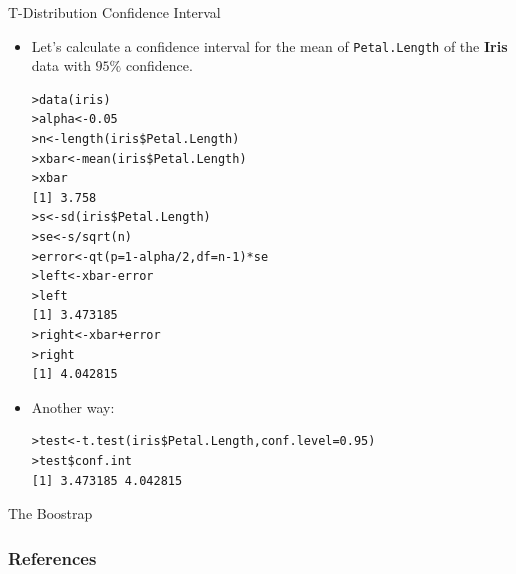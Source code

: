 \documentclass[handout]{beamer}
\begin{document}
\begin{frame}[fragile]{T-Distribution Confidence Interval}
\scriptsize{
\begin{itemize}
 \item Let's calculate a confidence interval for the mean of \verb+Petal.Length+ of the \textbf{Iris} data with $95\%$ confidence.
\begin{verbatim}
>data(iris)
>alpha<-0.05
>n<-length(iris$Petal.Length)
>xbar<-mean(iris$Petal.Length)
>xbar
[1] 3.758
>s<-sd(iris$Petal.Length)
>se<-s/sqrt(n)
>error<-qt(p=1-alpha/2,df=n-1)*se
>left<-xbar-error
>left
[1] 3.473185
>right<-xbar+error
>right
[1] 4.042815
\end{verbatim}
\item Another way:
\begin{verbatim}
>test<-t.test(iris$Petal.Length,conf.level=0.95)
>test$conf.int
[1] 3.473185 4.042815
\end{verbatim}


\end{itemize}



}
 
\end{frame}

\begin{frame}{The Boostrap}
 
\end{frame}





\begin{frame}[allowframebreaks]\scriptsize
\frametitle{References}


%
\end{frame}  









\end{document}
